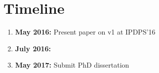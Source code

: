 \section{Timeline}
\label{sec:timeline}

\begin{enumerate}
\item \textbf{May 2016:} Present paper on \archer v1 at IPDPS'16
\item \textbf{July 2016:} 
\item \textbf{May 2017:} Submit PhD dissertation
\end{enumerate}

